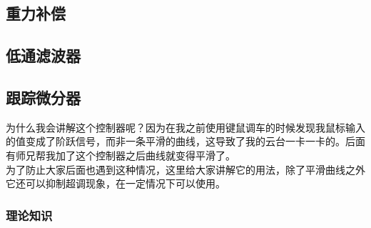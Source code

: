 \documentclass[UTF8,a4paper,12pt]{ctexart}
\begin{document}
        \subsection{重力补偿}

        \subsection{低通滤波器}
      
        \subsection{跟踪微分器}
        \begin{flushleft}
          为什么我会讲解这个控制器呢？因为在我之前使用键鼠调车的时候发现我鼠标输入的值变成了阶跃信号，而非一条平滑的曲线，这导致了我的云台一卡一卡的。后面有师兄帮我加了这个控制器之后曲线就变得平滑了。
          \\为了防止大家后面也遇到这种情况，这里给大家讲解它的用法，除了平滑曲线之外它还可以抑制超调现象，在一定情况下可以使用。
        \end{flushleft}
          \subsubsection{理论知识}
          
\end{document}
